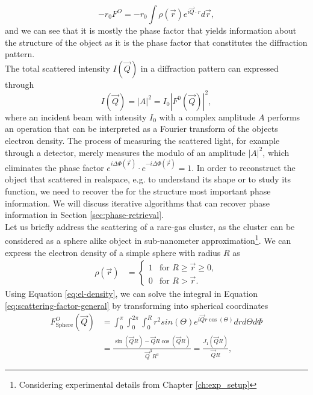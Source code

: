 \begin{equation}
-r_{0}F^{O}=-r_{0}\int \rho\left(\vec{r}\right) e^{i \vec{Q}\cdot r}d\vec{r},
\label{eq:scattering-factor-general}
\end{equation}
and we can see that it is mostly the phase factor that yields information about the structure of the object as it is the phase factor that constitutes the diffraction pattern.\\
The total scattered intensity $I\left(\vec{Q}\right)$ in a diffraction pattern can expressed through
\begin{equation}
I\left(\vec{Q}\right)=\left|A\right|^{2}=I_{0}\left|F^{0}\left(\vec{Q}\right)\right|^{2},
\label{eq:scattered-intensity}
\end{equation}
where an incident beam with intensity $I_{0}$ with a complex amplitude $A$ performs an operation that can be interpreted as a Fourier transform of the objects electron density. The process of measuring the scattered light, for example through a detector, merely measures the modulo of an amplitude $\left|A\right|^{2}$, which eliminates the phase factor $e^{i\Delta\Phi\left(\vec{r}\right)}\cdot e^{-i\Delta\Phi\left(\vec{r}\right)}=1$. In order to reconstruct the object that scattered in realspace, e.g. to understand its shape or to study its function, we need to recover the for the structure most important phase information. We will discuss iterative algorithms that can recover phase information in Section \ref{sec:phase-retrieval}.\\
Let us briefly address the scattering of a rare-gas cluster, as the cluster can be considered as a sphere alike object in sub-nanometer approximation\footnote{Considering experimental details from Chapter \ref{ch:exp_setup}}. We can express the electron density of a simple sphere with radius $R$ as 
\begin{align}
\rho\left(\vec{r}\right)&=\begin{cases}
1& \text{for $R \geq \vec{r} \geq 0$},\\
0&\text{for $R > \vec{r}$}.
\end{cases}
\label{eq:el-density}
\end{align}
Using Equation \eqref{eq:el-density}, we can solve the integral in Equation \eqref{eq:scattering-factor-general} by transforming into spherical coordinates
\begin{align}
F_{\text{Sphere}}^{O}\left(\vec{Q}\right) &= \int_{0}^{\pi}\int_{0}^{2\pi}\int_{0}^{R} r^{2}  sin\left(\Theta\right) e^{i \vec{Q} r \cos\left(\Theta\right)} dr d\Theta d\Phi\\
&=\frac{\sin\left(\vec{Q} R\right)-\vec{Q} R\cos\left(\vec{Q} R\right)}{\vec{Q}^{3} R^{3}}=\frac{J_{1}\left(\vec{Q}R\right)}{\vec{Q}R},
\label{eq:scattering from sphere}
\end{align}
